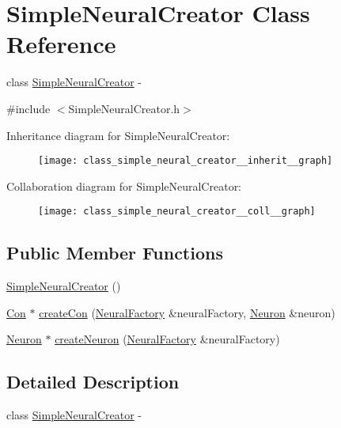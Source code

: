 \hypertarget{class_simple_neural_creator}{
\section{SimpleNeuralCreator Class Reference}
\label{class_simple_neural_creator}
}


class \hyperlink{class_simple_neural_creator}{SimpleNeuralCreator} -\/  




{\ttfamily \#include $<$SimpleNeuralCreator.h$>$}



Inheritance diagram for SimpleNeuralCreator:\nopagebreak
\begin{figure}[H]
\begin{center}
\leavevmode
\texttt{[image: class\_simple\_neural\_creator\_\_inherit\_\_graph]}
\end{center}
\end{figure}


Collaboration diagram for SimpleNeuralCreator:\nopagebreak
\begin{figure}[H]
\begin{center}
\leavevmode
\texttt{[image: class\_simple\_neural\_creator\_\_coll\_\_graph]}
\end{center}
\end{figure}
\subsection*{Public Member Functions}
\begin{DoxyCompactItemize}
\item 
\hyperlink{class_simple_neural_creator_adbb88d9250fc4cd85b036039286918bc}{SimpleNeuralCreator} ()
\item 
\hyperlink{class_con}{Con} $\ast$ \hyperlink{class_simple_neural_creator_a5348f4b7f6b4a02a68f37e6504adbc87}{createCon} (\hyperlink{class_neural_factory}{NeuralFactory} \&neuralFactory, \hyperlink{class_neuron}{Neuron} \&neuron)
\item 
\hyperlink{class_neuron}{Neuron} $\ast$ \hyperlink{class_simple_neural_creator_a10ead035477d8e04fee2cdfc7743f378}{createNeuron} (\hyperlink{class_neural_factory}{NeuralFactory} \&neuralFactory)
\end{DoxyCompactItemize}


\subsection{Detailed Description}
class \hyperlink{class_simple_neural_creator}{SimpleNeuralCreator} -\/ 

